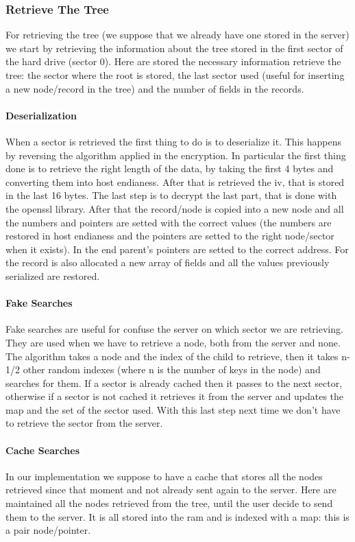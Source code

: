 \subsubsection{Retrieve The Tree}
For retrieving the tree (we suppose that we already have one stored in the server) we start by retrieving the information about the tree stored in the first sector of the hard drive (sector 0). Here are stored the necessary information retrieve the tree: the sector where the root is stored, the last sector used (useful for inserting a new node/record in the tree) and the number of fields in the records.\\ 
\paragraph{Deserialization} When a sector is retrieved the first thing to do is to deserialize it. This happens by reversing the algorithm applied in the encryption. In particular the first thing done is to retrieve the right length of the data, by taking the first 4 bytes and converting them into host endianess. After that is retrieved the iv, that is stored in the last 16 bytes. The last step is to decrypt the last part, that is done with the openssl library. After that the record/node is copied into a new node and all the numbers and pointers are setted with the correct values (the numbers are restored in host endianess and the pointers are setted to the right node/sector when it exists). In the end parent's pointers are setted to the correct address. For the record is also allocated a new array of fields and all the values previously serialized are restored.
\paragraph{Fake Searches}
Fake searches are useful for confuse the server on which sector we are retrieving. They are used when we have to retrieve a node, both from the server and none. 
The algorithm takes a node and the index of the child to retrieve, then it takes n-1/2 other random indexes (where n is the number of keys in the node) and searches for them. If a sector is already cached then it passes to the next sector, otherwise if a sector is not cached it retrieves it from the server and updates the map and the set of the sector used.
With this last step next time we don't have to retrieve the sector from the server.
\paragraph{Cache Searches}
In our implementation we suppose to have a cache that stores all the nodes retrieved since that moment and not already sent again to the server. Here are maintained all the nodes retrieved from the tree, until the user decide to send them to the server. It is all stored into the ram and is indexed with a map: this is a pair node/pointer. 


